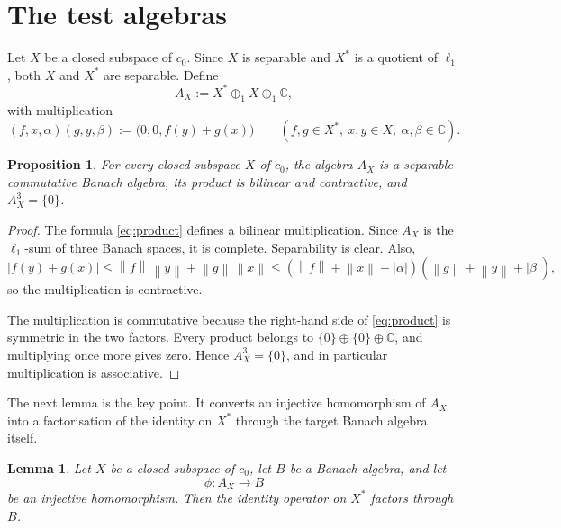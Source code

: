 \documentclass[11pt]{amsart}
\newcommand{\C}{\mathbb{C}}
\newcommand{\norm}[1]{\left\lVert #1\right\rVert}
\renewcommand{\le}{\leqslant}
\theoremstyle{plain}
\newtheorem{lemma}[theorem]{Lemma}
\newtheorem{prop}[theorem]{Proposition}
\theoremstyle{remark}
\numberwithin{equation}{section}
\begin{document}
\section{The test algebras}

Let $X$ be a closed subspace of $c_0$. Since $X$ is separable and $X^*$ is a quotient of $\ell_1$, both $X$ and $X^*$ are separable. Define
\[
A_X := X^* \oplus_1 X \oplus_1 \C,
\]
with multiplication
\begin{equation}\label{eq:product}
(f,x,\alpha)(g,y,\beta) := \bigl(0,0,f(y)+g(x)\bigr)
\qquad (f,g\in X^*,\ x,y\in X,\ \alpha,\beta\in \C).
\end{equation}

\begin{prop}\label{prop:AX}
For every closed subspace $X$ of $c_0$, the algebra $A_X$ is a separable commutative Banach algebra, its product is bilinear and contractive, and $A_X^3=\{0\}$.
\end{prop}

\begin{proof}
The formula \eqref{eq:product} defines a bilinear multiplication. Since $A_X$ is the $\ell_1$-sum of three Banach spaces, it is complete. Separability is clear. Also,
\[
|f(y)+g(x)| \le \norm{f}\,\norm{y}+\norm{g}\,\norm{x}
\le (\norm{f}+\norm{x}+|\alpha|)(\norm{g}+\norm{y}+|\beta|),
\]
so the multiplication is contractive.

The multiplication is commutative because the right-hand side of \eqref{eq:product} is symmetric in the two factors. Every product belongs to $\{0\}\oplus\{0\}\oplus\C$, and multiplying once more gives zero. Hence $A_X^3=\{0\}$, and in particular multiplication is associative.
\end{proof}

The next lemma is the key point. It converts an injective homomorphism of $A_X$ into a factorisation of the identity on $X^*$ through the target Banach algebra itself.

\begin{lemma}\label{lem:factor-id}
Let $X$ be a closed subspace of $c_0$, let $B$ be a Banach algebra, and let
\[
\phi:A_X\longrightarrow B
\]
be an injective homomorphism. Then the identity operator on $X^*$ factors through $B$.
\end{lemma}
\end{document}
